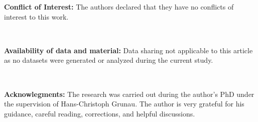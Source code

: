 \documentclass[12pt,a4paper,twoside]{article}
\begin{document}



{\bf Conflict of Interest:} The authors declared that they have no conflicts of interest to this work.

\

{\bf Availability of data and material:} Data sharing not applicable to this article as no datasets were generated or analyzed during the current study.

\

{\bf Acknowlegments:} The research was carried out during the author’s PhD under the supervision of Hans-Christoph Grunau. The author is very grateful for his guidance, careful reading, corrections, and helpful discussions.





\end{document}
